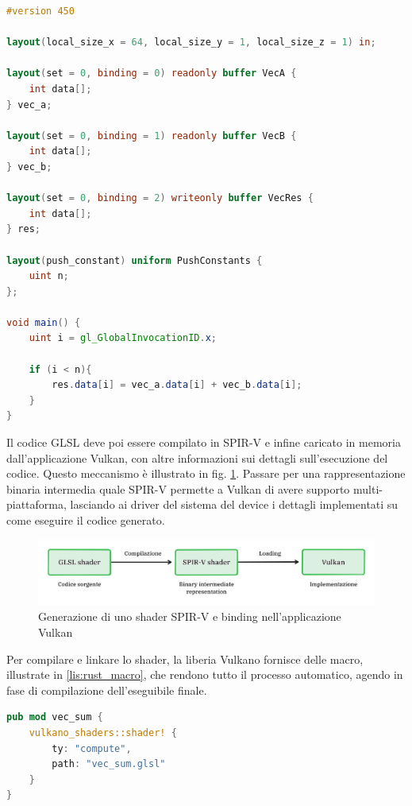 \vspace{5mm}
\begin{lstlisting}[language=GLSL, caption=Shader GLSL di somma di vettori, label=lis:vulkan_shader]
#version 450

layout(local_size_x = 64, local_size_y = 1, local_size_z = 1) in;

layout(set = 0, binding = 0) readonly buffer VecA {
    int data[];
} vec_a;

layout(set = 0, binding = 1) readonly buffer VecB {
    int data[];
} vec_b;

layout(set = 0, binding = 2) writeonly buffer VecRes {
    int data[];
} res;

layout(push_constant) uniform PushConstants {
    uint n;
};

void main() {
    uint i = gl_GlobalInvocationID.x;

    if (i < n){
        res.data[i] = vec_a.data[i] + vec_b.data[i];
    }
}    
\end{lstlisting}
\vspace{5mm}

Il codice GLSL deve poi essere compilato in SPIR-V e infine caricato in memoria dall'applicazione Vulkan, con altre informazioni sui dettagli sull'esecuzione del codice. Questo meccanismo è illustrato in fig. \ref{fig:shader}. Passare per una rappresentazione binaria intermedia quale SPIR-V permette a Vulkan di avere supporto multi-piattaforma, lasciando ai driver del sistema del device i dettagli implementati su come eseguire il codice generato.

\begin{figure}[ht]
    \centering
    \includegraphics[width=.9\linewidth]{images/chapter2/shader.png}
    \caption{Generazione di uno shader SPIR-V e binding nell'applicazione Vulkan}
    \label{fig:shader}
\end{figure}

Per compilare e linkare lo shader, la liberia Vulkano fornisce delle macro, illustrate in \ref{lis:rust_macro}, che rendono tutto il processo automatico, agendo in fase di compilazione dell'eseguibile finale.

\newpage

\vspace{5mm}
\begin{lstlisting}[language=Rust, caption=Compilazione e binding dello shader GLSL, label=lis:rust_macro]
pub mod vec_sum {
    vulkano_shaders::shader! {
        ty: "compute",
        path: "vec_sum.glsl"
    }
}
\end{lstlisting}
\vspace{5mm}

